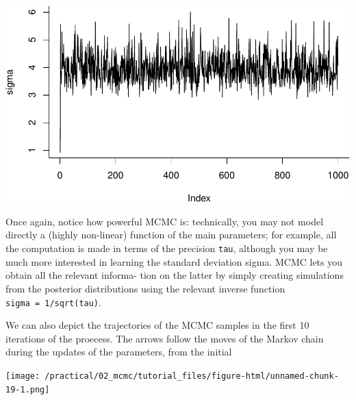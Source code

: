 \documentclass[
]{article}
\begin{document}
\includegraphics[width=0.5\linewidth]{tutorial_files/figure-latex/unnamed-chunk-11-2}

Once again, notice how powerful MCMC is: technically, you may not model
directly a (highly non-linear) function of the main parameters; for
example, all the computation is made in terms of the precision
\texttt{tau}, although you may be much more interested in learning the
standard deviation sigma. MCMC lets you obtain all the relevant informa-
tion on the latter by simply creating simulations from the posterior
distributions using the relevant inverse function
\texttt{sigma\ =\ 1/sqrt(tau)}.

We can also depict the trajectories of the MCMC samples in the first 10
iterations of the proecess. The arrows follow the moves of the Markov
chain during the updates of the parameters, from the initial

\texttt{[image: /practical/02\_mcmc/tutorial\_files/figure-html/unnamed-chunk-19-1.png]}
\end{document}
